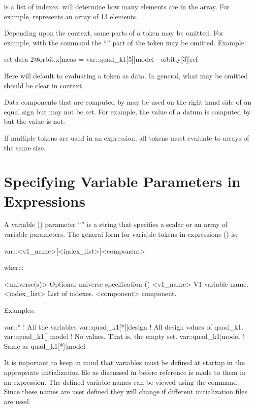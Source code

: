  is a list of indexes.  will determine
how many elements are in the array. For example,  
represents an array of 13 elements. 

Depending upon the context, some parts of a token may be omitted. For example,
with the  command the ``'' part of the token may be omitted.
Example:
\begin{example}
  set data 2@orbit.x|meas = var::quad_k1[5]|model - orbit.y[3]|ref
\end{example}
Here \tao will default to evaluating a token as data. In general, what may be omitted
should be clear in context.

Data components that are computed by \tao may be used on the right hand side of an equal
sign but may not be set. For example, the  value of a datum is computed by \tao
but the  value is not.

If multiple tokens are used in an expression, all tokens must evaluate to arrays of the
same size.

\section{Specifying Variable Parameters in Expressions}
\label{s:var.token}

A variable () parameter ``'' is a string that specifies a scalar or an array
of variable parameters. The general form for variable tokens in expressions
() is:
\begin{example}
  var::<v1_name>[<index_list>]<component>
\end{example}
where:
\begin{example}
  <universe(s)>       Optional universe specification ()
  <v1_name>           V1 variable name.
  <index_list>        List of indexes.
  <component>         component. 
\end{example}
Examples:
\begin{example}
  var::*                     ! All the variables
  var::quad_k1[*]|design     ! All design values of quad_k1.
  var::quad_k1[]|model       ! No values. That is, the empty set.
  var::quad_k1|model         ! Same as quad_k1[*]|model
\end{example}

It is important to keep in mind that variables must be defined at startup in the
appropriate initialization file as discussed in  before reference is made
to them in an expression.  The defined  variable names can be viewed using
the  command. Since these names are user defined they will change if different
initialization files are used.

